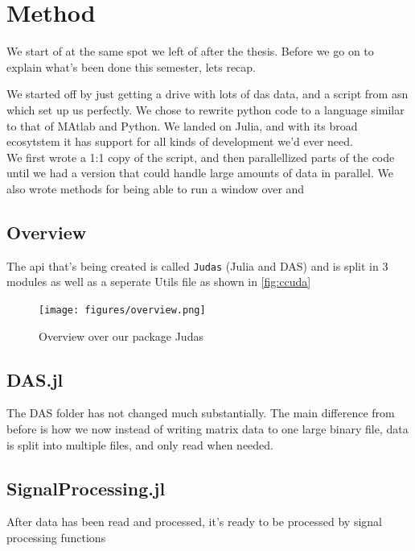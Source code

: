 \chapter{Method}
\label{chap:method}

We start of at the same spot we left of after the thesis. Before we go on to explain what's been done this semester, lets recap. 

We started off by just getting a drive with lots of \acrshort{das} data, and a script from \acrfull{asn} which set up us perfectly. We chose to rewrite python code to a language similar to that of MAtlab and Python. We landed on Julia, and with its broad ecosytstem it has support for all kinds of development we'd ever need. \\

We first wrote a 1:1 copy of the script, and then parallellized parts of the code until we had a version that could handle large amounts of data in parallel. We also wrote methods for being able to run a window over and 


\section{Overview}

The \acrshort{api} that's being created is called \texttt{Judas} (Julia and DAS) and is split in 3 modules as well as a seperate Utils file as shown in \ref{fig:ccuda}

\begin{figure}[h]
    \centering
    \texttt{[image: figures/overview.png]}
    \caption{Overview over our package Judas}
    \label{fig:judasoverview}
\end{figure}


\section{DAS.jl}

The DAS folder has not changed much substantially. The main difference from before is how we now instead of writing matrix data to one large binary file, data is split into multiple files, and only read when needed.

\section{SignalProcessing.jl}

After data has been read and processed, it's ready to be processed by signal processing functions 

